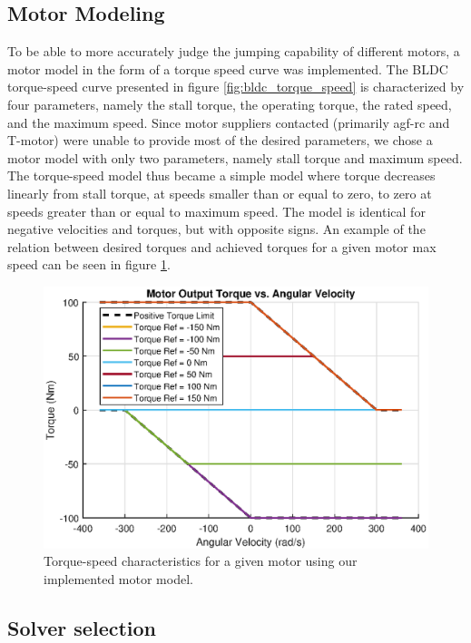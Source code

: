 \subsection{Motor Modeling}
\label{sec:motor_modeling}

To be able to more accurately judge the jumping capability of different motors, a motor model in the form of a torque speed curve was implemented. The BLDC torque-speed curve presented in figure \ref{fig:bldc_torque_speed} is characterized by four parameters, namely the stall torque, the operating torque, the rated speed, and the maximum speed. Since motor suppliers contacted (primarily agf-rc and T-motor) were unable to provide most of the desired parameters, we chose a motor model with only two parameters, namely stall torque and maximum speed. The torque-speed model thus became a simple model where torque decreases linearly from stall torque, at speeds smaller than or equal to zero, to zero at speeds greater than or equal to maximum speed. The model is identical for negative velocities and torques, but with opposite signs. An example of the relation between desired torques and achieved torques for a given motor max speed can be seen in figure \ref{fig:torque_speed_func}.

\begin{figure}
    \centering
    \includegraphics[width=\textwidth]{Images/torque_speed_func.eps}
    \caption{Torque-speed characteristics for a given motor using our implemented motor model.}
    \label{fig:torque_speed_func}
\end{figure}

\subsection{Solver selection}

